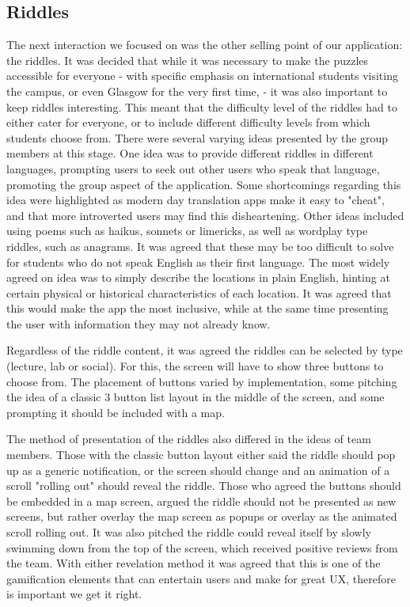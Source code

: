 \documentclass[10pt,twocolumn]{article} %
\begin{document}
\subsection*{Riddles}
The next interaction we focused on was the other selling point of our application: the riddles. 
It was decided that while it was necessary to make the puzzles accessible for everyone - with specific emphasis on international students visiting the campus, or even Glasgow for the very first time, - it was also important to keep riddles interesting.
This meant that the difficulty level of the riddles had to either cater for everyone, or to include different difficulty levels from which students choose from.
There were several varying ideas presented by the group members at this stage.
One idea was to provide different riddles in different languages, prompting users to seek out other users who speak that language, promoting the group aspect of the application. Some shortcomings regarding this idea were highlighted as modern day translation apps make it easy to "cheat", and that more introverted users may find this disheartening.
Other ideas included using poems such as haikus, sonnets or limericks, as well as wordplay type riddles, such as anagrams. It was agreed that these may be too difficult to solve for students who do not speak English as their first language.
The most widely agreed on idea was to simply describe the locations in plain English, hinting at certain physical or historical characteristics of each location. It was agreed that this would make the app the most inclusive, while at the same time presenting the user with information they may not already know.

Regardless of the riddle content, it was agreed the riddles can be selected by type (lecture, lab or social). For this, the screen will have to show three buttons to choose from. 
The placement of buttons varied by implementation, some pitching the idea of a classic 3 button list layout in the middle of the screen, and some prompting it should be included with a map.

The method of presentation of the riddles also differed in the ideas of team members. 
Those with the classic button layout either said the riddle should pop up as a generic notification, or the screen should change and an animation of a scroll "rolling out" should reveal the riddle.
Those who agreed the buttons should be embedded in a map screen, argued the riddle should not be presented as new screens, but rather overlay the map screen as popups or overlay as the animated scroll rolling out.
It was also pitched the riddle could reveal itself by slowly swimming down from the top of the screen, which received positive reviews from the team.
With either revelation method it was agreed that this is one of the gamification elements that can entertain users and make for great UX, therefore is important we get it right.
\end{document}
